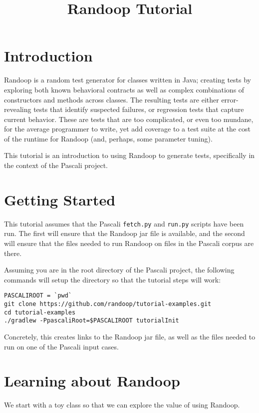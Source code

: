 \documentclass[11pt, oneside]{article} %
\title{Randoop Tutorial}
\newcommand{\cmd}[1]{{\texttt{#1}}}
\begin{document}
\maketitle

\section{Introduction}
Randoop is a random test generator for classes written in Java; 
creating tests by exploring both known behavioral contracts as well as complex combinations of constructors and methods across classes.
The resulting tests are either error-revealing tests that identify suspected failures, or regression tests that capture current behavior.
These are tests that are too complicated, or even too mundane, for the average programmer to write, yet add coverage to a test suite at the cost of the runtime for Randoop (and, perhaps, some parameter tuning).

This tutorial is an introduction to using Randoop to generate tests, specifically in the context of the Pascali project.

\section{Getting Started}
This tutorial assumes that the Pascali \cmd{fetch.py} and \cmd{run.py} scripts have been run.
The first will ensure that the Randoop jar file is available, and the second will ensure that the files needed to run Randoop on files in the Pascali corpus are there.

Assuming you are in the root directory of the Pascali project, the following commands will setup the directory so that the tutorial steps will work:
\begin{verbatim}
PASCALIROOT = `pwd`
git clone https://github.com/randoop/tutorial-examples.git
cd tutorial-examples
./gradlew -PpascaliRoot=$PASCALIROOT tutorialInit 
\end{verbatim}
Concretely, this creates links to the Randoop jar file, as well as the files needed to run on one of the Pascali input cases.

\section{Learning about Randoop}\label{thebasics}
We start with a toy class so that we can explore the value of using Randoop.
\end{document}
